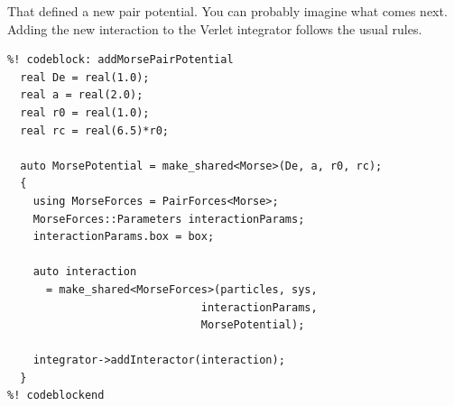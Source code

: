 That defined a new pair potential. You can probably imagine what comes next.
Adding the new interaction to the Verlet integrator follows the usual rules.
\begin{lstlisting}
%! codeblock: addMorsePairPotential
  real De = real(1.0);
  real a = real(2.0);
  real r0 = real(1.0);
  real rc = real(6.5)*r0;

  auto MorsePotential = make_shared<Morse>(De, a, r0, rc);
  {
    using MorseForces = PairForces<Morse>;
    MorseForces::Parameters interactionParams;
    interactionParams.box = box;

    auto interaction
      = make_shared<MorseForces>(particles, sys,
                              interactionParams,
                              MorsePotential);

    integrator->addInteractor(interaction);
  }
%! codeblockend
\end{lstlisting}

